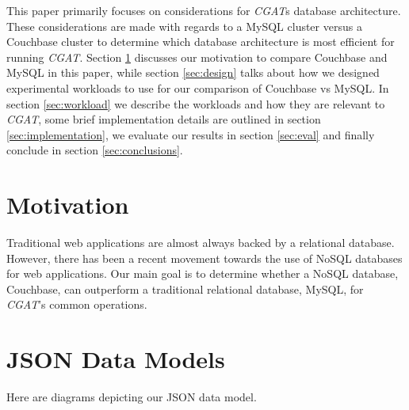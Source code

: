 \documentclass[10pt, conference, compsocconf]{IEEEtran}
\begin{document}

This paper primarily focuses on considerations for \textit{CGAT}s database
architecture. These considerations are made with regards to a MySQL cluster
versus a Couchbase cluster to determine which database architecture is most
efficient for running \textit{CGAT}. Section \ref{sec:motive} discusses our
motivation to compare Couchbase and MySQL in this paper, while section
\ref{sec:design} talks about how we designed experimental workloads to use for
our comparison of Couchbase vs MySQL. In section \ref{sec:workload} we
describe the workloads and how they are relevant to \textit{CGAT}, some brief
implementation details are outlined in section \ref{sec:implementation}, we
evaluate our results in section \ref{sec:eval} and finally conclude in
section \ref{sec:conclusions}.

\section{Motivation}\label{sec:motive}
Traditional web applications are almost always backed by a relational database.
However, there has been a recent movement towards the use of NoSQL databases for
web applications. Our main goal is to determine whether a NoSQL database, Couchbase,
can outperform a traditional relational database, MySQL, for \textit{CGAT}'s
common operations.

\onecolumn
\appendices

\section{JSON Data Models}\label{sec:data_models}
\centering
Here are diagrams depicting our JSON data model.
\end{document}
